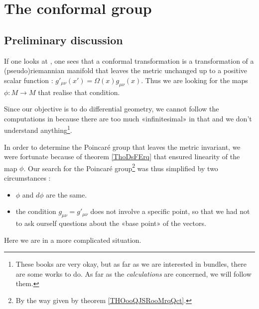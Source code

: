 
\section{The conformal group}

\subsection{Preliminary discussion}

If one looks at \cite{ooIYOHooMRMfXl,ooDPRUooOFPyPH}, one sees that a conformal transformation is a transformation of a (pseudo)riemannian manifold that leaves the metric unchanged up to a positive scalar function : \( g'_{\mu\nu}(x')=\Omega(x)g_{\mu\nu}(x)\). Thus we are looking for the maps \( \phi\colon M\to M\) that realise that condition.

Since our objective is to do differential geometry, we cannot follow the computations in \cite{ooIYOHooMRMfXl,ooDPRUooOFPyPH} because there are too much «infinitesimal» in that and we don't understand anything\footnote{These books are very okay, but as far as we are interested in bundles, there are some works to do. As far as the \emph{calculations} are concerned, we will follow them.}.

In order to determine the Poincaré group that leaves the metric invariant, we were fortunate because of theorem \ref{ThoDsFErq} that ensured linearity of the map \( \phi\). Our search for the Poincaré group\footnote{By the way given by theorem \ref{THOooQJSRooMrqQct}.} was thus simplified by two circumstances :
\begin{itemize}
    \item \( \phi\) and \( d\phi\) are the same.
    \item the condition \( g_{\mu\nu}=g'_{\mu\nu}\) does not involve a specific point, so that we had not to ask ourself questions about the «base point» of the vectors.
\end{itemize}
Here we are in a more complicated situation. 

